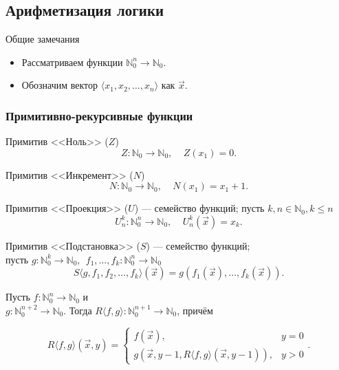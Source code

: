\subsection{Арифметизация логики}


Общие замечания
\begin{itemize}
\item Рассматриваем функции $\mathbb{N}^n_0\to\mathbb{N}_0$.
\item Обозначим вектор $\langle x_1, x_2, \dots, x_n\rangle$ как $\overrightarrow{x}$.
\end{itemize}


\subsubsection{Примитивно-рекурсивные функции}
\begin{definition}[Примитивы Z, N, U, S]
    Примитив <<Ноль>> ($Z$)
\[ Z: \mathbb{N}_0\to\mathbb{N}_0,\ \ \ \ \ Z(x_1) = 0.\]
\end{definition}
\begin{definition}
Примитив <<Инкремент>> ($N$)
\[ N: \mathbb{N}_0\to\mathbb{N}_0,\ \ \ \ \ N(x_1) = x_1+1.\]
\end{definition}
\begin{definition}
Примитив <<Проекция>> ($U$) — семейство функций; пусть $k,n \in \mathbb{N}_0, k \le n$\vspace{-0.3cm}
\[ U^k_n: \mathbb{N}^n_0 \to \mathbb{N}_0,\ \ \ \ \ U^k_n(\overrightarrow{x}) = x_k.\]
\end{definition}
\begin{definition}
Примитив <<Подстановка>> ($S$) --- семейство функций;\\ пусть $g: \mathbb{N}^k_0 \to \mathbb{N}_0,\ \ f_1,\dots,f_k: \mathbb{N}^n_0 \to \mathbb{N}_0$
\[ S\langle g,f_1,f_2,\dots,f_k \rangle (\overrightarrow{x}) = g(f_1(\overrightarrow{x}),\dots,f_k(\overrightarrow{x})).\]
\end{definition}

\begin{definition}
Пусть $f: \mathbb{N}^n_0\to\mathbb{N}_0$ и \\$g: \mathbb{N}^{n+2}_0 \to\mathbb{N}_0$.
Тогда $R\langle f,g\rangle: \mathbb{N}^{n+1}_0\to\mathbb{N}_0$, причём

\[ R\langle f,g\rangle(\overrightarrow{x},y)=
 \left\{\begin{array}{ll}
  f(\overrightarrow{x}), &y=0\\
  g(\overrightarrow{x},y-1,R\langle f,g\rangle (\overrightarrow{x},y-1)), &y > 0
\end{array}\right..\]
\end{definition}

